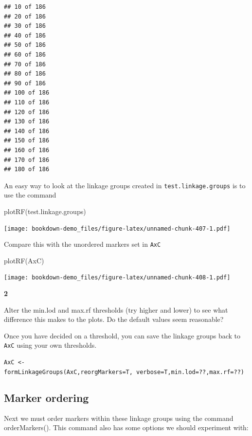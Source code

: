 \documentclass[
]{book}
\makeatletter
\newenvironment{Shaded}{\begin{snugshade}}{\end{snugshade}}
\newcommand{\FunctionTok}[1]{\textcolor[rgb]{0.00,0.00,0.00}{#1}}
\newcommand{\NormalTok}[1]{#1}
\newenvironment{kframe}{%
\medskip{}
\setlength{\fboxsep}{.8em}
 \def\at@end@of@kframe{}%
 \ifinner\ifhmode%
  \def\at@end@of@kframe{\end{minipage}}%
  \begin{minipage}{\columnwidth}%
 \fi\fi%
 \def\FrameCommand##1{\hskip\@totalleftmargin \hskip-\fboxsep
 \colorbox{shadecolor}{##1}\hskip-\fboxsep
     \hskip-\linewidth \hskip-\@totalleftmargin \hskip\columnwidth}%
 \MakeFramed {\advance\hsize-\width
   \@totalleftmargin\z@ \linewidth\hsize
   \@setminipage}}%
 {\par\unskip\endMakeFramed%
 \at@end@of@kframe}
\newenvironment{rmdblock}[1]
  {
  \begin{itemize}
  \renewcommand{\labelitemi}{
    \raisebox{-.7\height}[0pt][0pt]{
      {\setkeys{Gin}{width=3em,keepaspectratio}\texttt{[image: images/\#1]}}
    }
  }
  \setlength{\fboxsep}{1em}
  \begin{kframe}
  \item
  }
  {
  \end{kframe}
  \end{itemize}
  }
\newenvironment{rmdquiz}
  {\begin{rmdblock}{quiz}}
  {\end{rmdblock}}
\makeatother
\begin{document}
\begin{verbatim}
## 10 of 186 
## 20 of 186 
## 30 of 186 
## 40 of 186 
## 50 of 186 
## 60 of 186 
## 70 of 186 
## 80 of 186 
## 90 of 186 
## 100 of 186 
## 110 of 186 
## 120 of 186 
## 130 of 186 
## 140 of 186 
## 150 of 186 
## 160 of 186 
## 170 of 186 
## 180 of 186
\end{verbatim}

An easy way to look at the linkage groups created in \texttt{test.linkage.groups} is to use the command

\begin{Shaded}
\begin{Highlighting}[]
\FunctionTok{plotRF}\NormalTok{(test.linkage.groups)}
\end{Highlighting}
\end{Shaded}

\texttt{[image: bookdown-demo\_files/figure-latex/unnamed-chunk-407-1.pdf]}

Compare this with the unordered markers set in \texttt{AxC}

\begin{Shaded}
\begin{Highlighting}[]
\FunctionTok{plotRF}\NormalTok{(AxC) }
\end{Highlighting}
\end{Shaded}

\texttt{[image: bookdown-demo\_files/figure-latex/unnamed-chunk-408-1.pdf]}
\begin{rmdquiz}
\textbf{2}

Alter the min.lod and max.rf thresholds (try higher and lower) to see what difference this makes to the plots. Do the default values seem reasonable?
\end{rmdquiz}

Once you have decided on a threshold, you can save the linkage groups back to \texttt{AxC} using your own thresholds.

\texttt{AxC\ \textless{}-formLinkageGroups(AxC,reorgMarkers=T,\ verbose=T,min.lod=??,max.rf=??)}

\hypertarget{marker-ordering}{%
\subsection{Marker ordering}\label{marker-ordering}}

Next we must order markers within these linkage groups using the command orderMarkers(). This command also has some options we should experiment with:
\end{document}

